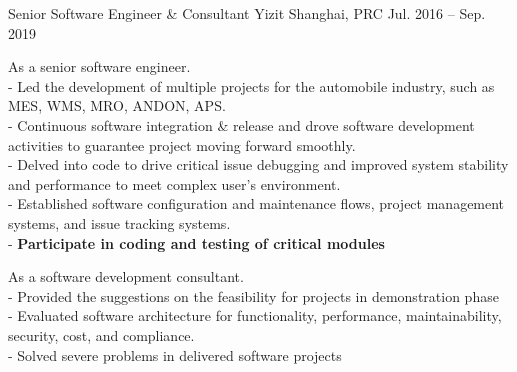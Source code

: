 \begin{cventries}
  \cventry
    {Senior Software Engineer \& Consultant} %
    {Yizit} %
    {Shanghai, PRC} %
    {Jul. 2016 – Sep. 2019} %
    {
      \begin{cvitems} %
        \item {As a senior software engineer. \\ - Led the development of multiple projects for the automobile industry, such as MES, WMS, MRO, ANDON, APS.  \\ - Continuous software integration \& release and drove software development activities to guarantee project moving forward smoothly. \\- Delved into code to drive critical issue debugging and improved system stability and performance to meet complex user’s environment. \\ - Established software configuration and maintenance flows, project management systems, and issue tracking systems.  \\ - \textbf{Participate in coding and testing of critical modules}}
        \item {As a software development consultant. \\ - Provided the suggestions on the feasibility for projects in demonstration phase\\- Evaluated software architecture for functionality, performance, maintainability, security, cost, and compliance.\\- Solved severe problems in delivered software projects}
      \end{cvitems}
    }
\end{cventries}
